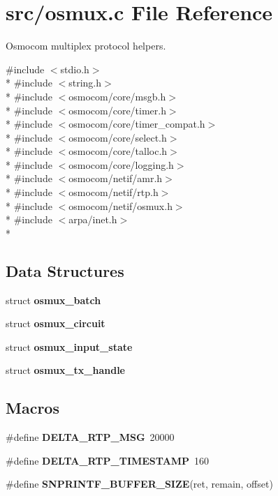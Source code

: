 \section{src/osmux.c File Reference}
\label{osmux_8c}


Osmocom multiplex protocol helpers.  


{\ttfamily \#include $<$stdio.\+h$>$}\\*
{\ttfamily \#include $<$string.\+h$>$}\\*
{\ttfamily \#include $<$osmocom/core/msgb.\+h$>$}\\*
{\ttfamily \#include $<$osmocom/core/timer.\+h$>$}\\*
{\ttfamily \#include $<$osmocom/core/timer\+\_\+compat.\+h$>$}\\*
{\ttfamily \#include $<$osmocom/core/select.\+h$>$}\\*
{\ttfamily \#include $<$osmocom/core/talloc.\+h$>$}\\*
{\ttfamily \#include $<$osmocom/core/logging.\+h$>$}\\*
{\ttfamily \#include $<$osmocom/netif/amr.\+h$>$}\\*
{\ttfamily \#include $<$osmocom/netif/rtp.\+h$>$}\\*
{\ttfamily \#include $<$osmocom/netif/osmux.\+h$>$}\\*
{\ttfamily \#include $<$arpa/inet.\+h$>$}\\*
\subsection*{Data Structures}
\begin{DoxyCompactItemize}
\item 
struct {\bf osmux\+\_\+batch}
\item 
struct {\bf osmux\+\_\+circuit}
\item 
struct {\bf osmux\+\_\+input\+\_\+state}
\item 
struct {\bf osmux\+\_\+tx\+\_\+handle}
\end{DoxyCompactItemize}
\subsection*{Macros}
\begin{DoxyCompactItemize}
\item 
\#define {\bfseries D\+E\+L\+T\+A\+\_\+\+R\+T\+P\+\_\+\+M\+SG}~20000
\item 
\#define {\bfseries D\+E\+L\+T\+A\+\_\+\+R\+T\+P\+\_\+\+T\+I\+M\+E\+S\+T\+A\+MP}~160
\item 
\#define {\bfseries S\+N\+P\+R\+I\+N\+T\+F\+\_\+\+B\+U\+F\+F\+E\+R\+\_\+\+S\+I\+ZE}(ret,  remain,  offset)
\end{DoxyCompactItemize}
